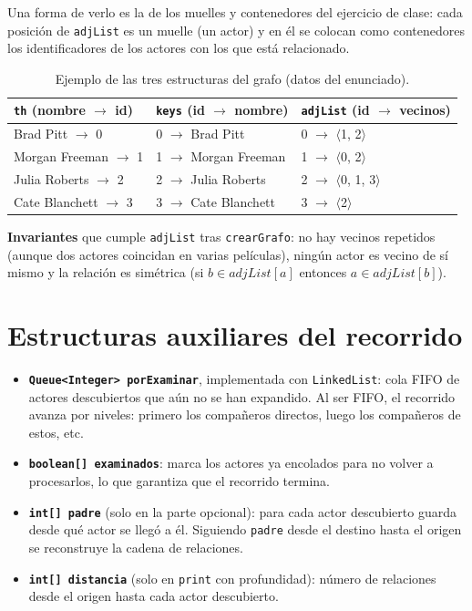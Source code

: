 \documentclass[a4paper,11pt]{report}
\begin{document}
Una forma de verlo es la de los muelles y contenedores del ejercicio de clase: cada posición de \texttt{adjList} es un muelle (un actor) y en él se colocan como contenedores los identificadores de los actores con los que está relacionado.

\begin{table}[ht]
\centering
\begin{tabular}{l l l}
\toprule
\texttt{th} (nombre $\to$ id) & \texttt{keys} (id $\to$ nombre) & \texttt{adjList} (id $\to$ vecinos) \\
\midrule
Brad Pitt $\to$ 0 & 0 $\to$ Brad Pitt & 0 $\to$ $\langle$1, 2$\rangle$ \\
Morgan Freeman $\to$ 1 & 1 $\to$ Morgan Freeman & 1 $\to$ $\langle$0, 2$\rangle$ \\
Julia Roberts $\to$ 2 & 2 $\to$ Julia Roberts & 2 $\to$ $\langle$0, 1, 3$\rangle$ \\
Cate Blanchett $\to$ 3 & 3 $\to$ Cate Blanchett & 3 $\to$ $\langle$2$\rangle$ \\
\bottomrule
\end{tabular}
\caption{Ejemplo de las tres estructuras del grafo (datos del enunciado).}
\end{table}

\textbf{Invariantes} que cumple \texttt{adjList} tras \texttt{crearGrafo}: no hay vecinos repetidos (aunque dos actores coincidan en varias películas), ningún actor es vecino de sí mismo y la relación es simétrica (si $b \in adjList[a]$ entonces $a \in adjList[b]$).

\section{Estructuras auxiliares del recorrido}

\begin{itemize}
    \item \textbf{\texttt{Queue<Integer> porExaminar}}, implementada con \texttt{LinkedList}: cola FIFO de actores descubiertos que aún no se han expandido. Al ser FIFO, el recorrido avanza por niveles: primero los compañeros directos, luego los compañeros de estos, etc.
    \item \textbf{\texttt{boolean[] examinados}}: marca los actores ya encolados para no volver a procesarlos, lo que garantiza que el recorrido termina.
    \item \textbf{\texttt{int[] padre}} (solo en la parte opcional): para cada actor descubierto guarda desde qué actor se llegó a él. Siguiendo \texttt{padre} desde el destino hasta el origen se reconstruye la cadena de relaciones.
    \item \textbf{\texttt{int[] distancia}} (solo en \texttt{print} con profundidad): número de relaciones desde el origen hasta cada actor descubierto.
\end{itemize}
\end{document}
